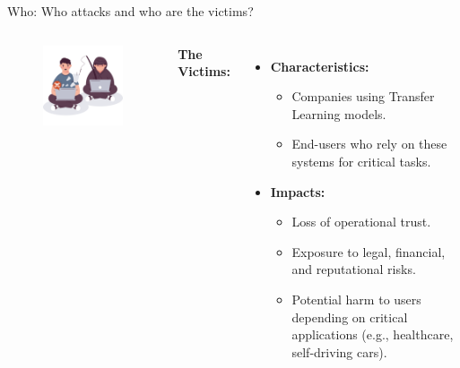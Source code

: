 \begin{frame}{Who: Who attacks and who are the victims?}
    \begin{columns}
        \begin{itemize}
            \begin{figure}
                \centering
                \includegraphics[width=1\linewidth]{img/The_Victim.png}
            \end{figure}
        \end{itemize}

        \textbf{\large The Victims:}
        \begin{itemize}
            \item \textbf{Characteristics:}
            \begin{itemize}
                \item Companies using Transfer Learning models.
                \item End-users who rely on these systems for critical tasks.
            \end{itemize}
            \item \textbf{Impacts:}
            \begin{itemize}
                \item Loss of operational trust.
                \item Exposure to legal, financial, and reputational risks.
                \item Potential harm to users depending on critical applications (e.g., healthcare, self-driving cars).
            \end{itemize}
        \end{itemize}
    \end{columns}
\end{frame}
